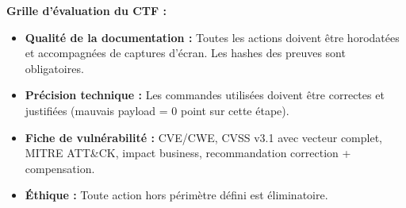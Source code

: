 \begin{boxinfo}
\textbf{Grille d'évaluation du CTF :}
\begin{itemize}
    \item \textbf{Qualité de la documentation :} Toutes les actions
          doivent être horodatées et accompagnées de captures d'écran.
          Les hashes  des preuves sont obligatoires.
    \item \textbf{Précision technique :} Les commandes utilisées doivent
          être correctes et justifiées (mauvais payload = 0 point sur
          cette étape).
    \item \textbf{Fiche de vulnérabilité :} CVE/CWE, CVSS v3.1 avec
          vecteur complet, MITRE ATT\&CK, impact business, recommandation
          correction + compensation.
    \item \textbf{Éthique :} Toute action hors périmètre défini est
          éliminatoire.
\end{itemize}
\end{boxinfo}
